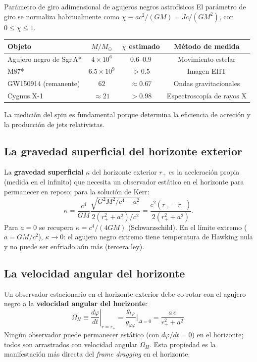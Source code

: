 \begin{ejemplo}{Parámetro de giro adimensional de agujeros negros astrofísicos}{}
El parámetro de giro se normaliza habitualmente como $\chi \equiv ac^2/(GM) = Jc/(GM^2)$, con $0 \leq \chi \leq 1$.

\begin{center}
\begin{tabular}{lccc}
\hline
Objeto & $M/M_\odot$ & $\chi$ estimado & Método de medida \\
\hline
Agujero negro de Sgr\,A* & $4\times10^6$ & $0.6$--$0.9$ & Movimiento estelar \\
M87* & $6.5\times10^9$ & $> 0.5$ & Imagen EHT \\
GW150914 (remanente) & $62$ & $\approx 0.67$ & Ondas gravitacionales \\
Cygnus X-1 & $\approx 21$ & $> 0.98$ & Espectroscopía de rayos X \\
\hline
\end{tabular}
\end{center}

La medición del spin es fundamental porque determina la eficiencia de acreción y la producción de jets relativistas.
\end{ejemplo}

\subsection{La gravedad superficial del horizonte exterior}

La \textbf{gravedad superficial} $\kappa$ del horizonte exterior $r_+$ es la aceleración propia (medida en el infinito) que necesita un observador estático en el horizonte para permanecer en reposo; para la solución de Kerr:
\begin{equation}
  \kappa = \frac{c^4}{GM}\frac{\sqrt{G^2M^2/c^4 - a^2}}{2(r_+^2 + a^2)/c^2}
         = \frac{c^2(r_+ - r_-)}{2(r_+^2 + a^2)}.
  \label{eq:gravedad_sup_kerr}
\end{equation}
Para $a = 0$ se recupera $\kappa = c^4/(4GM)$ (Schwarzschild). En el límite extremo ($a = GM/c^2$), $\kappa \to 0$: el agujero negro extremo tiene temperatura de Hawking nula y no puede ser enfriado aún más (tercera ley).

\subsection{La velocidad angular del horizonte}

Un observador estacionario en el horizonte exterior debe co-rotar con el agujero negro a la \textbf{velocidad angular del horizonte}:
\begin{equation}
  \Omega_H \equiv \left.\frac{d\varphi}{dt}\right|_{r=r_+}
  = \frac{g_{t\varphi}}{g_{\varphi\varphi}}\bigg|_{\Delta=0}
  = \frac{a\,c}{r_+^2 + a^2}.
  \label{eq:omega_horizonte}
\end{equation}
Ningún observador puede permanecer estático (con $d\varphi/dt = 0$) en el horizonte; todos son arrastrados con velocidad angular $\Omega_H$. Esta propiedad es la manifestación más directa del \emph{frame dragging} en el horizonte.

